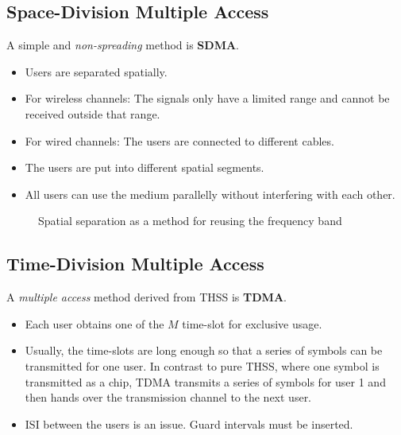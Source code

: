 \begin{refsection}
\subsection{Space-Division Multiple Access}

A simple and \emph{non-spreading} method is  \textbf{\acf{SDMA}}.
\begin{itemize}
	\item Users are separated spatially.
	\item For wireless channels: The signals only have a limited range and cannot be received outside that range.
	\item For wired channels: The users are connected to different cables.
	\item The users are put into different spatial segments.
	\item All users can use the medium parallelly without interfering with each other.
\end{itemize}

\begin{figure}[H]
	\centering
	\caption{Spatial separation as a method for reusing the frequency band}
\end{figure}

\subsection{Time-Division Multiple Access}

A \emph{multiple access} method derived from \ac{THSS} is  \textbf{\acf{TDMA}}.
\begin{itemize}
	\item Each user obtains one of the $M$ time-slot for exclusive usage.
	\item Usually, the time-slots are long enough so that a series of symbols can be transmitted for one user. In contrast to pure \ac{THSS}, where one symbol is transmitted as a chip, \ac{TDMA} transmits a series of symbols for user 1 and then hands over the transmission channel to the next user.
	\item \ac{ISI} between the users is an issue. Guard intervals must be inserted.
\end{itemize}


\end{refsection}
